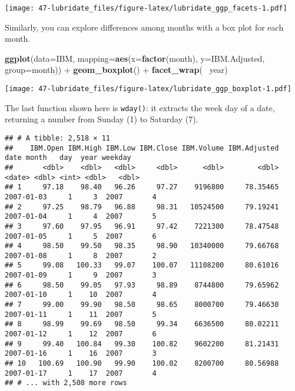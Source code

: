 \documentclass[]{book}
\newenvironment{Shaded}{\begin{snugshade}}{\end{snugshade}}
\newcommand{\KeywordTok}[1]{\textcolor[rgb]{0.13,0.29,0.53}{\textbf{{#1}}}}
\newcommand{\DataTypeTok}[1]{\textcolor[rgb]{0.13,0.29,0.53}{{#1}}}
\newcommand{\StringTok}[1]{\textcolor[rgb]{0.31,0.60,0.02}{{#1}}}
\newcommand{\NormalTok}[1]{{#1}}
\begin{document}
\texttt{[image: 47-lubridate\_files/figure-latex/lubridate\_ggp\_facets-1.pdf]}

Similarly, you can explore differences among months with a box plot for
each month.

\begin{Shaded}
\begin{Highlighting}[]
\KeywordTok{ggplot}\NormalTok{(}\DataTypeTok{data=}\NormalTok{IBM, }\DataTypeTok{mapping=}\KeywordTok{aes}\NormalTok{(}\DataTypeTok{x=}\KeywordTok{factor}\NormalTok{(month), }\DataTypeTok{y=}\NormalTok{IBM.Adjusted, }\DataTypeTok{group=}\NormalTok{month)) +}
\StringTok{  }\KeywordTok{geom_boxplot}\NormalTok{() +}
\StringTok{  }\KeywordTok{facet_wrap}\NormalTok{(~}\StringTok{ }\NormalTok{year)}
\end{Highlighting}
\end{Shaded}

\texttt{[image: 47-lubridate\_files/figure-latex/lubridate\_ggp\_boxplot-1.pdf]}

The last function shown here is \texttt{wday()}: it extracts the week
day of a date, returning a number from Sunday (1) to Saturday (7).

\begin{Shaded}
\end{Shaded}

\begin{verbatim}
## # A tibble: 2,518 × 11
##    IBM.Open IBM.High IBM.Low IBM.Close IBM.Volume IBM.Adjusted       date month   day  year weekday
##       <dbl>    <dbl>   <dbl>     <dbl>      <dbl>        <dbl>     <date> <dbl> <int> <dbl>   <dbl>
## 1     97.18    98.40   96.26     97.27    9196800     78.35465 2007-01-03     1     3  2007       4
## 2     97.25    98.79   96.88     98.31   10524500     79.19241 2007-01-04     1     4  2007       5
## 3     97.60    97.95   96.91     97.42    7221300     78.47548 2007-01-05     1     5  2007       6
## 4     98.50    99.50   98.35     98.90   10340000     79.66768 2007-01-08     1     8  2007       2
## 5     99.08   100.33   99.07    100.07   11108200     80.61016 2007-01-09     1     9  2007       3
## 6     98.50    99.05   97.93     98.89    8744800     79.65962 2007-01-10     1    10  2007       4
## 7     99.00    99.90   98.50     98.65    8000700     79.46630 2007-01-11     1    11  2007       5
## 8     98.99    99.69   98.50     99.34    6636500     80.02211 2007-01-12     1    12  2007       6
## 9     99.40   100.84   99.30    100.82    9602200     81.21431 2007-01-16     1    16  2007       3
## 10   100.69   100.90   99.90    100.02    8200700     80.56988 2007-01-17     1    17  2007       4
## # ... with 2,508 more rows
\end{verbatim}
\end{document}
